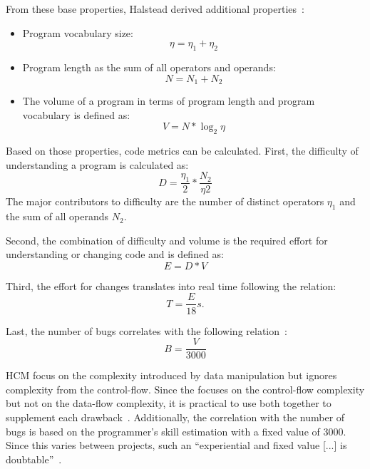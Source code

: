 From these base properties, Halstead derived additional properties~\cite{halstead1977elements}:
\begin{itemize}
    \item Program vocabulary size:
    \begin{displaymath}
        \eta = \eta_1 + \eta_2
    \end{displaymath}
    \item Program length as the sum of all operators and operands:
    \begin{displaymath}
        N = N_1 + N_2
    \end{displaymath}
    \item The volume of a program in terms of program length and program vocabulary is defined as: 
    \begin{displaymath}
        V = N * \log_2{\eta}
    \end{displaymath}
\end{itemize}

Based on those properties, code metrics can be calculated. 
First, the difficulty of understanding a program is calculated as:
\begin{displaymath}
    D = \frac{\eta_1}{2} * \frac{N_2}{\eta2}
\end{displaymath}
The major contributors to difficulty are the number of distinct operators $\eta_1$ and the sum of all operands $N_2$.

Second, the combination of difficulty and volume is the required effort for understanding or changing code and is defined as:
\begin{displaymath}
    E = D * V
\end{displaymath}

Third, the effort for changes translates into real time following the relation:
\begin{displaymath}
    T = \frac{E}{18}s.
\end{displaymath}

Last, the number of bugs correlates with the following relation~\cite{yu_survey_2010}:
\begin{displaymath}
    B = \frac{V}{3000}
\end{displaymath}

HCM focus on the complexity introduced by data manipulation but ignores complexity from the control-flow. Since the  focuses on the control-flow complexity but not on the data-flow complexity, it is practical to use both together to supplement each drawback~\cite{yu_survey_2010}.
Additionally, the correlation with the number of bugs is based on the programmer's skill estimation with a fixed value of 3000. Since this varies between projects, such an \enquote{experiential and fixed value [...] is doubtable}~\cite{yu_survey_2010}.

